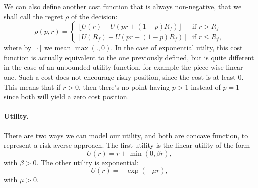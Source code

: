 We can also define another cost function that is always non-negative, that we shall call the
regret $\rho$ of the decision:
\begin{equation}
  \rho(p,r) =
  \begin{cases}
    \lfloor U(r) - U(pr + (1-p)R_f)\rfloor & \text{if } r>R_f\\
    \lfloor U(R_f) - U(pr + (1-p)R_f)\rfloor &\text{if } r\leq R_f,
  \end{cases}
\end{equation}
where by $\lfloor \cdot \rfloor$ we mean $\max(.,0)$. In the case of exponential
utilty, this cost function is actually equivalent to the one previously defined, but is
quite different in the case of an unbounded utility function, for example the piece-wise
linear one. Such a cost does not encourage risky position, since the cost is at least
0. This means that if $r>0$, then there's no point having $p>1$ instead of $p=1$ since
both will yield a zero cost position. 

\paragraph{Utility.}
There are two ways we can model our utility, and both are concave function, to represent a
risk-averse approach. The first utility is the linear utility of the form
\begin{equation}
  U(r) = r + \min(0, \beta r),
\end{equation}
with $\beta > 0$. The other utility is exponential:
\begin{equation}
  U(r) = -\exp(-\mu r),
\end{equation}
with $\mu > 0$.

